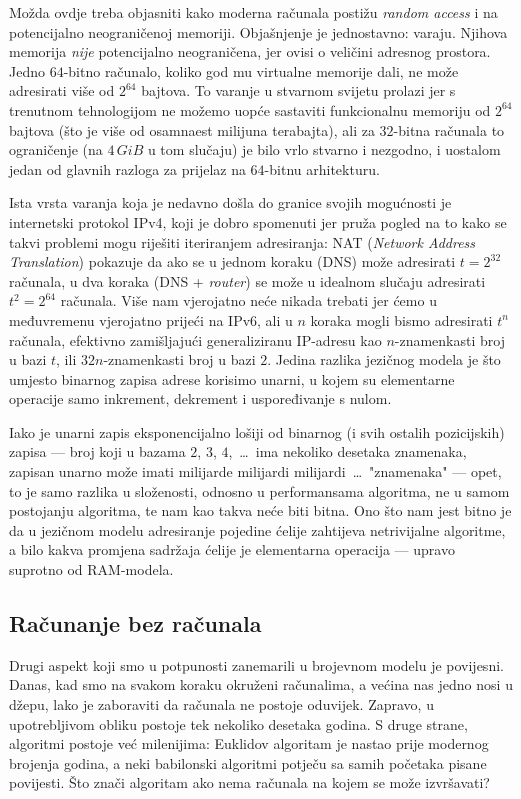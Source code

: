 Možda ovdje treba objasniti kako moderna računala postižu \emph{random access} i na potencijalno neograničenoj memoriji. Objašnjenje je jednostavno: varaju. Njihova memorija \emph{nije} potencijalno neograničena, jer ovisi o veličini adresnog prostora. Jedno $64$-bitno računalo, koliko god mu virtualne memorije dali, ne može adresirati više od $2^{64}$ bajtova. To varanje u stvarnom svijetu prolazi jer s trenutnom tehnologijom ne možemo uopće sastaviti funkcionalnu memoriju od $2^{64}$ bajtova (što je više od osamnaest milijuna terabajta), ali za $32$-bitna računala to ograničenje (na $4\,GiB$ u tom slučaju) je bilo vrlo stvarno i nezgodno, i uostalom jedan od glavnih razloga za prijelaz na $64$-bitnu arhitekturu.

Ista vrsta varanja koja je nedavno došla do granice svojih mogućnosti je internetski protokol IPv4, koji je dobro spomenuti jer pruža pogled na to kako se takvi problemi mogu riješiti iteriranjem adresiranja: NAT (\emph{Network Address Translation}) pokazuje da ako se u jednom koraku (DNS) može adresirati $t=2^{32}$ računala, u dva koraka (DNS + \emph{router}) se može u idealnom slučaju adresirati $t^2=2^{64}$ računala. Više nam vjerojatno neće nikada trebati jer ćemo u međuvremenu vjerojatno prijeći na IPv6, ali u $n$ koraka mogli bismo adresirati $t^n$ računala, efektivno zamišljajući generaliziranu IP-adresu kao $n$-znamenkasti broj u bazi $t$, ili $32n$-znamenkasti broj u bazi $2$. Jedina razlika jezičnog modela je što umjesto binarnog zapisa adrese korisimo unarni, u kojem su elementarne operacije samo inkrement, dekrement i  uspoređivanje s nulom.

Iako je unarni zapis eksponencijalno lošiji od binarnog (i svih ostalih pozicijskih) zapisa --- broj koji u bazama $2$, $3$, $4$,~\ldots\ ima nekoliko desetaka znamenaka, zapisan unarno može imati milijarde milijardi milijardi~\ldots\ "znamenaka" --- opet, to je samo razlika u složenosti, odnosno u performansama algoritma, ne u samom postojanju algoritma, te nam kao takva neće biti bitna. Ono što nam jest bitno je da u jezičnom modelu adresiranje pojedine ćelije zahtijeva netrivijalne algoritme, a bilo kakva promjena sadržaja ćelije je elementarna operacija --- upravo suprotno od RAM-modela.

\subsection{Računanje bez računala}

Drugi aspekt koji smo u potpunosti zanemarili u brojevnom modelu je povijesni. Danas, kad smo na svakom koraku okruženi računalima, a većina nas jedno nosi u džepu, lako je zaboraviti da računala ne postoje oduvijek. Zapravo, u upotrebljivom obliku postoje tek nekoliko desetaka godina. S druge strane, algoritmi postoje već milenijima: Euklidov algoritam je nastao prije modernog brojenja godina, a neki babilonski algoritmi potječu sa samih početaka pisane povijesti. Što znači algoritam ako nema računala na kojem se može izvršavati?

